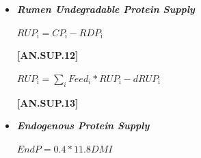 \begin{refsection}
\begin{itemize}
    \begin{center}
        \(RDPi = 0 ,\ if\ Kpi + Kdi \leq 0 \)
    \end{center}
        \vspace{0.5cm}
    
            {\raggedleft \textbf{[AN.SUP.10]}\par}
            \vspace{0.5cm}

    \begin{center}
        \(MPbact = 0.64 * min(1000 * 0.13 * TDNact_{\text{diet}}, 1000 * 0.85 * RDP_{\text{diet}})\)
    \end{center}
        \vspace{0.5cm}
    
            {\raggedleft \textbf{[AN.SUP.11]}\par}
            \vspace{0.5cm}

        \item \textbf{\textit{Rumen Undegradable Protein Supply}}
        \vspace{0.25cm}

    \begin{center}
        \(RUP_{\text{i}} = CP_{\text{i}} - RDP_{\text{i}}\)
    \end{center}
        \vspace{0.5cm}
    
            {\raggedleft \textbf{[AN.SUP.12]}\par}
            \vspace{0.5cm}

    \begin{center}
        \(RUP_{\text{i}} = \sum_{i}Feed_{i} * RUP_{\text{i}} - dRUP_{\text{i}}\)
    \end{center}
        \vspace{0.5cm}
    
            {\raggedleft \textbf{[AN.SUP.13]}\par}
            \vspace{0.5cm}

        \item \textbf{\textit{Endogenous Protein Supply}}
        \vspace{0.25cm}
    \begin{center}
        \(EndP = 0.4 * 11.8 DMI\)
    \end{center}
        \vspace{0.5cm}            
    \end{itemize}
    \vspace{0.25cm}


\end{refsection}
